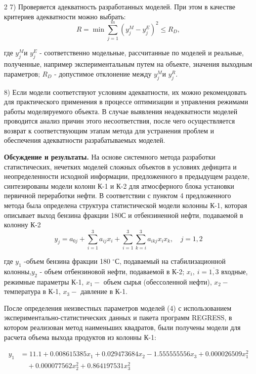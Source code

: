 \begin{multicols}{2}
7) Проверяется адекватность разработанных моделей. При этом в качестве
критериев адекватности можно выбрать:
\vspace{-0.5em}
\[R = \min{\sum_{j = 1}^{m}\left( y_{j}^{M} - y_{j}^{E} \right)^{2}} \leq R_{D},\]

где \(y_{j}^{M}\)и \(y_{j}^{E}\) - соответственно модельные, рассчитанные
по моделей и реальные, полученные, например экспериментальным путем на
объекте, значения выходным параметров; \(R_{D}\) - допустимое отклонение
между \(y_{j}^{M}\)и \(y_{j}^{R}.\)

8) Если модели соответствуют условиям адекватности, их можно
рекомендовать для практического применения в процессе оптимизации и
управления режимами работы моделируемого объекта. В случае выявления
неадекватности моделей проводится анализ причин этого несоответствия,
после чего осуществляется возврат к соответствующим этапам метода для
устранения проблем и обеспечения адекватности разрабатываемых моделей.

{\bfseries Обсуждение и результаты.} На основе системного метода разработки
статистических, нечетких моделей сложных объектов в условиях дефицита и
неопределенности исходной информации, предложенного в предыдущем
разделе, синтезированы модели колонн К-1 и К-2 для атмосферного блока
установки первичной переработки нефти. В соответствии с пунктом 4
предложенного метода была определена структура статистической модели
колонны К-1, которая описывает выход бензина фракции
180С и отбензиненной нефти, подаваемой в колонну К-2
\begin{equation}
y_{j} = a_{0j} + \sum_{i=1}^{3} a_{ij}x_{i} + \sum_{i=1}^{3} \sum_{k=i}^{3} a_{ikj}x_{i}x_{k}, \quad j=1,2
\end{equation}

где \(y_{1}\) -объем бензина фракции 180 $^\circ$С, подаваемый
на стабилизационной колонны,\(y_{2}\) - объем отбензиновой нефти,
подаваемой в К-2; \(x_{i},\ i = \overline{1,3}\) входные, режимные
параметры К-1, \(x_{1} -\) объем сырья (обессоленной
нефти), \(x_{2} -\) температура в К-1, \(x_{3} -\) давление в К-1.

После определения неизвестных параметров моделей (4) с использованием
экспериментально-статистических данных и пакета программ REGRESS, в
котором реализован метод наименьших квадратов, были получены модели для
расчета объема выхода продуктов из колонны К-1:
\end{multicols}
\vspace{-1em}
\begin{equation}
\begin{aligned}
y_{1} &= 11.1 + 0.008615385x_{1} + 0.029473684x_{2} - 1.555555556x_{3} + 0.000026509x_{1}^{2} \\
      &\quad + 0.000077562x_{2}^{2} + 0.864197531x_{3}^{2}
\end{aligned}
\end{equation}

